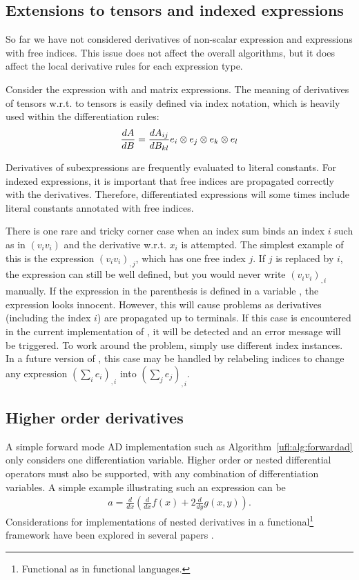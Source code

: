 \subsection{Extensions to tensors and indexed expressions}

So far we have not considered derivatives of non-scalar expression and
expressions with free indices.  This issue does not affect the overall
algorithms, but it does affect the local derivative rules for each
expression type.

Consider the expression  with  and  matrix
expressions.  The meaning of derivatives of tensors w.r.t. to tensors
is easily defined via index notation, which is heavily used within the
differentiation rules:
\begin{align}
\frac{d{A}}{d{B}} = \frac{dA_{ij}}{d B_{kl}} {e}_i\otimes{e}_j\otimes{e}_k\otimes{e}_l
\end{align}

Derivatives of subexpressions are frequently evaluated to literal
constants.  For indexed expressions, it is important that free indices
are propagated correctly with the derivatives.  Therefore, differentiated
expressions will some times include literal constants annotated with
free indices.

There is one rare and tricky corner case when an index sum binds an index
$i$ such as in $(v_i v_i)$ and the derivative w.r.t. $x_i$ is attempted.
The simplest example of this is the expression $(v_i v_i)_{,j}$, which has
one free index $j$.  If $j$ is replaced by $i$, the expression can still
be well defined, but you would never write $(v_i v_i)_{,i}$ manually.
If the expression in the parenthesis is defined in a variable , the expression  looks innocent. However,
this will cause problems as derivatives (including the index $i$) are
propagated up to terminals.  If this case is encountered in the current
implementation of \ufl{}, it will be detected and an error message will
be triggered.  To work around the problem, simply use different index
instances.  In a future version of \ufl{}, this case may be handled by
relabeling indices to change any expression $(\sum_i e_i)_{,i}$ into
$(\sum_j e_j)_{,i}$.

\subsection{Higher order derivatives}

A simple forward mode AD implementation such as
Algorithm~\ref{ufl:alg:forwardad} only considers one differentiation
variable.  Higher order or nested differential operators must also be
supported, with any combination of differentiation variables.  A simple
example illustrating such an expression can be
\begin{align} \label{ufl:eq:nested}
a = \frac{d}{dx}\left( \frac{d}{dx} f(x) + 2 \frac{d}{dy} g(x,y) \right) .
\end{align}
Considerations for implementations of nested derivatives
in a functional\footnote{Functional as in functional
languages.} framework have been explored in several papers
\citep{Karczmarczuk2001,PearlmutterSiskind2007,SiskindPearlmutter2008}.

